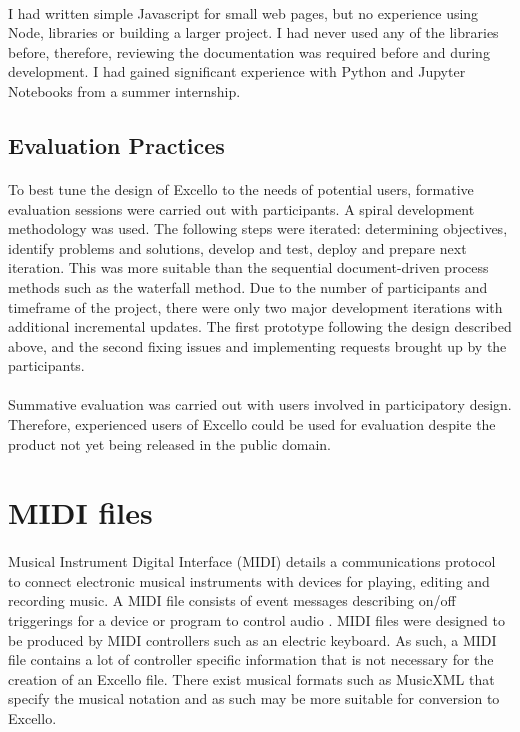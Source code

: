 \paragraph{} I had written simple Javascript for small web pages, but no experience using Node, libraries or building a larger project. I had never used any of the libraries before, therefore, reviewing the documentation was required before and during development. I had gained significant experience with Python and Jupyter Notebooks from a summer internship.

\subsection{Evaluation Practices}

\paragraph{} To best tune the design of Excello to the needs of potential users, formative evaluation sessions were carried out with participants. A spiral development methodology \cite{boehm:spiral} was used. The following steps were iterated: determining objectives, identify problems and solutions, develop and test, deploy and prepare next iteration. This was more suitable than the sequential document-driven process methods such as the waterfall method. Due to the number of participants and timeframe of the project, there were only two major development iterations with additional incremental updates. The first prototype following the design described above, and the second fixing issues and implementing requests brought up by the participants.

\paragraph{} Summative evaluation was carried out with users involved in participatory design. Therefore, experienced users of Excello could be used for evaluation despite the product not yet being released in the public domain.

\section{MIDI files}

\paragraph{} Musical Instrument Digital Interface (MIDI) details a communications protocol to connect electronic musical instruments with devices for playing, editing and recording music. A MIDI file consists of event messages describing on/off triggerings for a device or program to control audio \cite{huber:midimanual}. MIDI files were designed to be produced by MIDI controllers such as an electric keyboard. As such, a MIDI file contains a lot of controller specific information that is not necessary for the creation of an Excello file. There exist musical formats such as MusicXML that specify the musical notation and as such may be more suitable for conversion to Excello.

